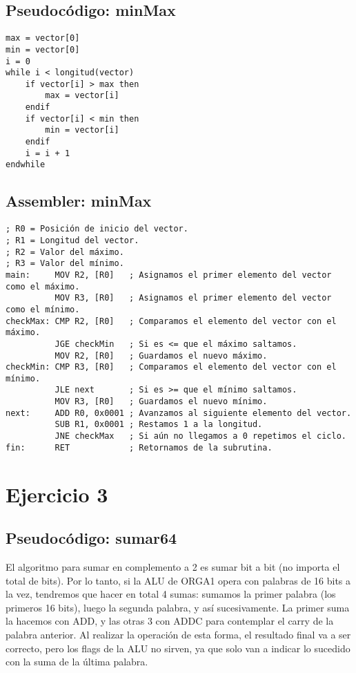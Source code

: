 \subsection{Pseudocódigo: minMax}

\begin{lstlisting}
max = vector[0]
min = vector[0]
i = 0
while i < longitud(vector)
    if vector[i] > max then
        max = vector[i]
    endif
    if vector[i] < min then
        min = vector[i]
    endif
    i = i + 1
endwhile
\end{lstlisting}

\pagebreak

\subsection{Assembler: minMax}

\begin{lstlisting}
; R0 = Posición de inicio del vector.
; R1 = Longitud del vector.
; R2 = Valor del máximo.
; R3 = Valor del mínimo.
main:     MOV R2, [R0]   ; Asignamos el primer elemento del vector como el máximo.
          MOV R3, [R0]   ; Asignamos el primer elemento del vector como el mínimo.
checkMax: CMP R2, [R0]   ; Comparamos el elemento del vector con el máximo.
          JGE checkMin   ; Si es <= que el máximo saltamos.
          MOV R2, [R0]   ; Guardamos el nuevo máximo.
checkMin: CMP R3, [R0]   ; Comparamos el elemento del vector con el mínimo.
          JLE next       ; Si es >= que el mínimo saltamos.
          MOV R3, [R0]   ; Guardamos el nuevo mínimo.
next:     ADD R0, 0x0001 ; Avanzamos al siguiente elemento del vector.
          SUB R1, 0x0001 ; Restamos 1 a la longitud.
          JNE checkMax   ; Si aún no llegamos a 0 repetimos el ciclo.
fin:      RET            ; Retornamos de la subrutina.
\end{lstlisting}

\section{Ejercicio 3}

\subsection{Pseudocódigo: sumar64}

El algoritmo para sumar en complemento a 2 es sumar bit a bit (no importa el total de bits). Por lo tanto, si la ALU de ORGA1 opera con palabras de 16 bits a la vez, tendremos que hacer en total 4 sumas: sumamos la primer palabra (los primeros 16 bits), luego la segunda palabra, y así sucesivamente. La primer suma la hacemos con ADD, y las otras 3 con ADDC para contemplar el carry de la palabra anterior. Al realizar la operación de esta forma, el resultado final va a ser correcto, pero los flags de la ALU no sirven, ya que solo van a indicar lo sucedido con la suma de la última palabra.

